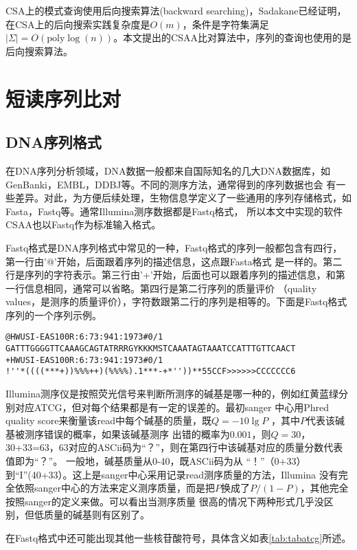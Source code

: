 CSA上的模式查询使用后向搜索算法(backward searching)，Sadakane已经证明，在CSA上的后向搜索实践复杂度是$O(m)$，条件是字符集满足
$|\Sigma|=O(\text{poly} \log(n))$\cite{sadakane2002succinct}。本文提出的CSAA比对算法中，序列的查询也使用的是后向搜索算法。

\section{短读序列比对}

\subsection{DNA序列格式}

在DNA序列分析领域，DNA数据一般都来自国际知名的几大DNA数据库，如GenBanki，EMBL，DDBJ等。不同的测序方法，通常得到的序列数据也会
有一些差异。对此，为方便后续处理，生物信息学定义了一些通用的序列存储格式，如Fasta，Fastq等。通常Illumina测序数据都是Fastq格式，
所以本文中实现的软件CSAA也以Fastq作为标准输入格式。

Fastq格式是DNA序列格式中常见的一种，Fastq格式的序列一般都包含有四行，第一行由'@'开始，后面跟着序列的描述信息，这点跟Fasta格式
是一样的。第二行是序列的字符表示。第三行由'+'开始，后面也可以跟着序列的描述信息，和第一行信息相同，通常可以省略。第四行是第二行序列的质量评价
（quality values，是测序的质量评价），字符数跟第二行的序列是相等的。下面是Fastq格式序列的一个序列示例。

\begin{verbatim}
@HWUSI-EAS100R:6:73:941:1973#0/1
GATTTGGGGTTCAAAGCAGTATRRRGYKKKMSTCAAATAGTAAATCCATTTGTTCAACT
+HWUSI-EAS100R:6:73:941:1973#0/1
!''*((((***+))%%%++)(%%%%).1***-+*''))**55CCF>>>>>>CCCCCCC6
\end{verbatim}

Illumina测序仪是按照荧光信号来判断所测序的碱基是哪一种的，例如红黄蓝绿分别对应ATCG，但对每个结果都是有一定的误差的。最初sanger
中心用Phred quality score来衡量该read中每个碱基的质量，既$Q=-10\lg P$ ，其中$P$代表该碱基被测序错误的概率，如果该碱基测序
出错的概率为$0.001$，则$Q=30$，30+33=63，63对应的ASCii码为“？”，则在第四行中该碱基对应的质量分数代表值即为“？”。
一般地，碱基质量从0-40，既ASCii码为从 “！”（0+33）到“I”(40+33）。这上是sanger中心采用记录read测序质量的方法，Illumina
没有完全依照sanger中心的方法来定义测序质量，而是把$P$换成了$P/(1-P)$，其他完全按照sanger的定义来做。可以看出当测序质量
很高的情况下两种形式几乎没区别，但低质量的碱基则有区别了。

在Fastq格式中还可能出现其他一些核苷酸符号，具体含义如表\ref{tab:tabatcg}所述。

